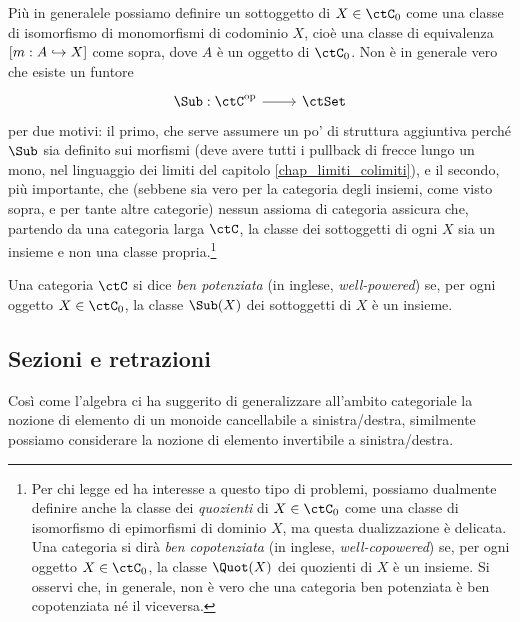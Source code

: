 \begin{definition}\label{def_sottoggetto}
	Più in generalele possiamo definire un sottoggetto di \(X\in\ctC_0\) come una classe di isomorfismo di	monomorfismi di codominio \(X\), cioè una classe di equivalenza \([m : A\hookrightarrow X]\) come sopra, dove \(A\) è un oggetto di \(\ctC_0\). Non è in generale vero che esiste un funtore
	\[\dmFun{\Sub}{\ctC^\op}{\ctSet}\]
	per due motivi: il primo, che serve assumere un po' di struttura aggiuntiva perché \(\Sub\) sia definito sui morfismi (deve avere tutti i pullback di frecce lungo un mono, nel linguaggio dei limiti del capitolo \ref{chap_limiti_colimiti}), e il secondo, più importante, che (sebbene sia vero per la categoria degli insiemi, come visto sopra, e per tante altre categorie) nessun assioma di categoria assicura che, partendo da una categoria larga \(\ctC\), la classe dei sottoggetti di ogni \(X\) sia un insieme e non una classe propria.\footnote{Per chi legge ed ha interesse a questo tipo di problemi, possiamo dualmente definire anche la classe dei \emph{quozienti} di \(X\in\ctC_0\) come una classe di isomorfismo di epimorfismi di dominio \(X\), ma questa dualizzazione è delicata. Una categoria si dirà \emph{ben copotenziata} (in inglese, \emph{well-copowered}) se, per ogni oggetto \(X\in\ctC_0\), la classe \(\Quot(X)\) dei quozienti di \(X\) è un insieme. Si osservi che, in generale, non è vero che una categoria ben potenziata è ben copotenziata né il viceversa.}
\end{definition}
\begin{definition}\label{def_cat_ben_potenziata}
	Una categoria \(\ctC\) si dice \emph{ben potenziata} (in inglese, \emph{well-powered}) se, per ogni oggetto \(X\in\ctC_0\), la classe \(\Sub(X)\) dei sottoggetti di \(X\) è un insieme.
\end{definition}
\subsection{Sezioni e retrazioni}\label{sec_sezretraz}
Così come l'algebra ci ha suggerito di generalizzare all'ambito categoriale la nozione di elemento di un monoide cancellabile a sinistra/destra,
similmente possiamo considerare la nozione di elemento invertibile a sinistra/destra.

